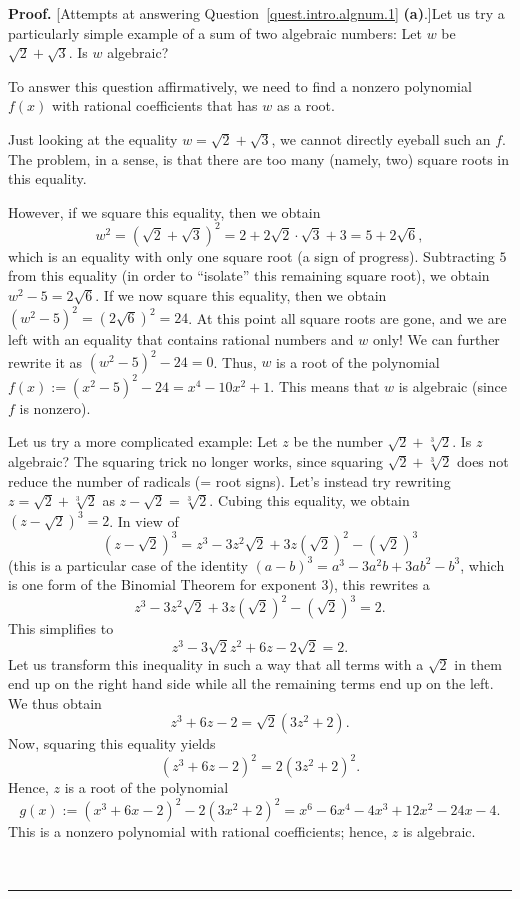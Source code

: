 \documentclass[numbers=enddot,12pt,final,onecolumn,notitlepage]{scrartcl}%
\numberwithin{exer}{subsection}
\theoremstyle{definition}
\newenvironment{proof}[1][Proof]{\noindent\textbf{#1.} }{\ \rule{0.5em}{0.5em}}
\begin{document}
\begin{proof}
[Attempts at answering Question~\ref{quest.intro.algnum.1} \textbf{(a)}.]Let
us try a particularly simple example of a sum of two algebraic numbers: Let
$w$ be $\sqrt{2} + \sqrt{3}$. Is $w$ algebraic?

To answer this question affirmatively, we need to find a nonzero polynomial
$f\left(  x \right)  $ with rational coefficients that has $w$ as a root.

Just looking at the equality $w = \sqrt{2} + \sqrt{3}$, we cannot directly
eyeball such an $f$. The problem, in a sense, is that there are too many
(namely, two) square roots in this equality.

However, if we square this equality, then we obtain
\[
w^{2}=\left(  \sqrt{2}+\sqrt{3}\right)  ^{2}=2+2\sqrt{2}\cdot\sqrt{3}+3
=5+2\sqrt{6},
\]
which is an equality with only one square root (a sign of progress).
Subtracting $5$ from this equality (in order to ``isolate'' this remaining
square root), we obtain $w^{2}-5=2\sqrt{6}$. If we now square this equality,
then we obtain $\left(  w^{2}-5\right)  ^{2}=\left(  2\sqrt{6}\right)
^{2}=24$. At this point all square roots are gone, and we are left with an
equality that contains rational numbers and $w$ only! We can further rewrite
it as $\left(  w^{2} - 5 \right)  ^{2} - 24 = 0$. Thus, $w$ is a root of the
polynomial $f\left(  x \right)  := \left(  x^{2}-5\right)  ^{2}-24 =
x^{4}-10x^{2}+1$. This means that $w$ is algebraic (since $f$ is nonzero).

Let us try a more complicated example: Let $z$ be the number $\sqrt
{2}+\sqrt[3]{2}$. Is $z$ algebraic? The squaring trick no longer works, since
squaring $\sqrt{2}+\sqrt[3]{2}$ does not reduce the number of radicals (= root
signs). Let's instead try rewriting $z=\sqrt{2}+\sqrt[3]{2}$ as $z-\sqrt
{2}=\sqrt[3]{2}$. Cubing this equality, we obtain $\left(  z-\sqrt{2}\right)
^{3}=2$. In view of
\[
\left(  z-\sqrt{2}\right)  ^{3}=z^{3}-3z^{2}\sqrt{2}+3z\left(  \sqrt
{2}\right)  ^{2}-\left(  \sqrt{2}\right)  ^{3}%
\]
(this is a particular case of the identity $\left(  a-b\right)  ^{3}%
=a^{3}-3a^{2}b+3ab^{2}-b^{3}$, which is one form of the Binomial Theorem for
exponent $3$), this rewrites a
\[
z^{3}-3z^{2}\sqrt{2}+3z\left(  \sqrt{2}\right)  ^{2}-\left(  \sqrt{2}\right)
^{3}=2.
\]
This simplifies to%
\[
z^{3}-3\sqrt{2}z^{2}+6z-2\sqrt{2}=2.
\]
Let us transform this inequality in such a way that all terms with a $\sqrt
{2}$ in them end up on the right hand side while all the remaining terms end
up on the left. We thus obtain
\[
z^{3}+6z-2=\sqrt{2}\left(  3z^{2}+2\right)  .
\]
Now, squaring this equality yields
\[
\left(  z^{3}+6z-2\right)  ^{2}=2\left(  3z^{2}+2\right)  ^{2}.
\]
Hence, $z$ is a root of the polynomial
\[
g\left(  x\right)  :=\left(  x^{3}+6x-2\right)  ^{2}-2\left(  3x^{2}+2\right)
^{2}=x^{6}-6x^{4}-4x^{3}+12x^{2}-24x-4.
\]
This is a nonzero polynomial with rational coefficients; hence, $z$ is algebraic.


\end{proof}
\end{document}
